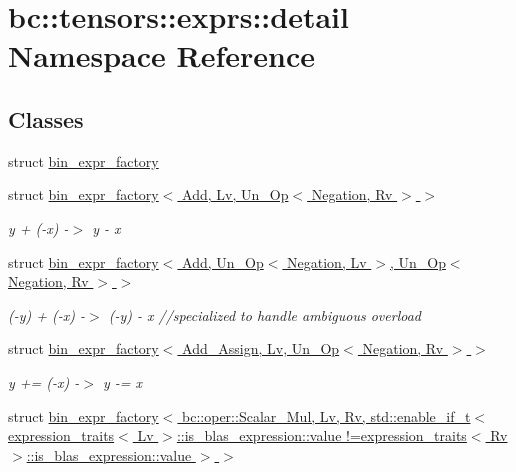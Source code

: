 \hypertarget{namespacebc_1_1tensors_1_1exprs_1_1detail}{}\section{bc\+:\+:tensors\+:\+:exprs\+:\+:detail Namespace Reference}
\label{namespacebc_1_1tensors_1_1exprs_1_1detail}
\subsection*{Classes}
\begin{DoxyCompactItemize}
\item 
struct \hyperlink{structbc_1_1tensors_1_1exprs_1_1detail_1_1bin__expr__factory}{bin\+\_\+expr\+\_\+factory}
\item 
struct \hyperlink{structbc_1_1tensors_1_1exprs_1_1detail_1_1bin__expr__factory_3_01Add_00_01Lv_00_01Un__Op_3_01Negation_00_01Rv_01_4_01_4}{bin\+\_\+expr\+\_\+factory$<$ Add, Lv, Un\+\_\+\+Op$<$ Negation, Rv $>$ $>$}
\begin{DoxyCompactList}\small\item\em y + (-\/x) -\/$>$ y -\/ x \end{DoxyCompactList}\item 
struct \hyperlink{structbc_1_1tensors_1_1exprs_1_1detail_1_1bin__expr__factory_3_01Add_00_01Un__Op_3_01Negation_00d86892bae805f04f4b10908e626a3cb5}{bin\+\_\+expr\+\_\+factory$<$ Add, Un\+\_\+\+Op$<$ Negation, Lv $>$, Un\+\_\+\+Op$<$ Negation, Rv $>$ $>$}
\begin{DoxyCompactList}\small\item\em (-\/y) + (-\/x) -\/$>$ (-\/y) -\/ x //specialized to handle ambiguous overload \end{DoxyCompactList}\item 
struct \hyperlink{structbc_1_1tensors_1_1exprs_1_1detail_1_1bin__expr__factory_3_01Add__Assign_00_01Lv_00_01Un__Op_3_01Negation_00_01Rv_01_4_01_4}{bin\+\_\+expr\+\_\+factory$<$ Add\+\_\+\+Assign, Lv, Un\+\_\+\+Op$<$ Negation, Rv $>$ $>$}
\begin{DoxyCompactList}\small\item\em y += (-\/x) -\/$>$ y -\/= x \end{DoxyCompactList}\item 
struct \hyperlink{structbc_1_1tensors_1_1exprs_1_1detail_1_1bin__expr__factory_3_01bc_1_1oper_1_1Scalar__Mul_00_0179bec0862a78086fe62692cba7b203b3}{bin\+\_\+expr\+\_\+factory$<$ bc\+::oper\+::\+Scalar\+\_\+\+Mul, Lv, Rv, std\+::enable\+\_\+if\+\_\+t$<$ expression\+\_\+traits$<$ Lv $>$\+::is\+\_\+blas\+\_\+expression\+::value !=expression\+\_\+traits$<$ Rv $>$\+::is\+\_\+blas\+\_\+expression\+::value $>$ $>$}

\end{DoxyCompactItemize}
